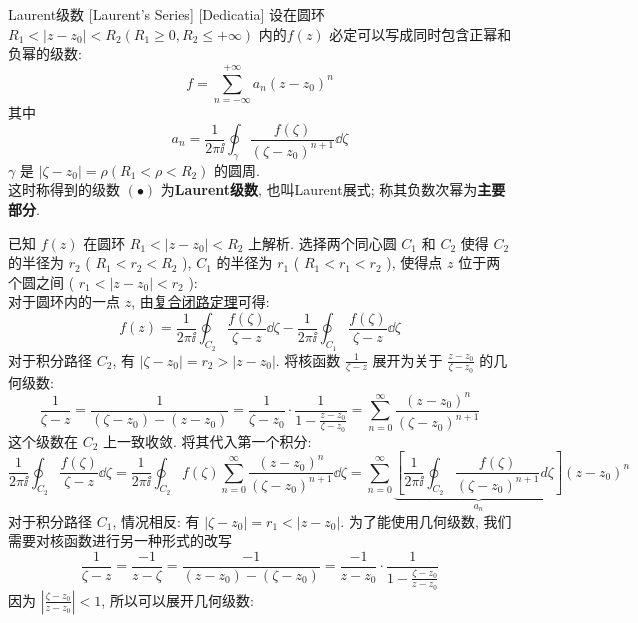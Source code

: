 \documentclass[UTF8]{ctexart}
\begin{document}
        \begin{thm}
            [Laurent]
            {Laurent级数}
            [Laurent's Series]
            [Dedicatia]
            设在圆环 \(R_1<|z-z_0|<R_2(R_1\geqslant 0, R_2\leqslant+\infty )\) 内的  \(f(z)\) 必定可以写成同时包含正幂和负幂的级数: 
            \[f=\sum_{n=-\infty}^{+\infty}a_n(z-z_0)^n\tag{ \(\bullet\) }\]
            其中
            \[a_n=\frac{1}{2\pi\ii}\oint_{\gamma}\frac{f(\zeta)}{(\zeta-z_0)^{n+1}}\dd{\zeta}\]
            \(\gamma\) 是 \(|\zeta-z_0|=\rho(R_1<\rho< R_2)\) 的圆周. \\
            这时称得到的级数 \((\bullet)\) 为\textbf{Laurent级数}, 也叫Laurent展式; 称其负数次幂为\textbf{主要部分}. 
        \end{thm}

        \begin{prf}
            已知  \(f(z)\)  在圆环  \(R_1 < |z - z_0| < R_2\)  上解析. 选择两个同心圆  \(C_1\)  和  \(C_2\)  使得  \(C_2\)  的半径为  \(r_2\)  ( \(R_1 < r_2 < R_2\) ),  \(C_1\)  的半径为  \(r_1\)  ( \(R_1 < r_1 < r_2\) ), 使得点  \(z\)  位于两个圆之间 ( \(r_1 < |z - z_0| < r_2\) ):\\
            对于圆环内的一点  \(z\), 由\hyperref[thm:CombinedClosedCircuit]{复合闭路定理}可得: 
            \[f(z) = \frac{1}{2\pi\ii} \oint_{C_2} \frac{f(\zeta)}{\zeta - z} \dd\zeta - \frac{1}{2\pi\ii} \oint_{C_1} \frac{f(\zeta)}{\zeta - z}  \dd\zeta\]
            对于积分路径  \(C_2\), 有  \(|\zeta - z_0| = r_2 > |z - z_0|\). 将核函数  \(\frac{1}{\zeta - z}\)  展开为关于  \(\frac{z-z_0}{\zeta-z_0}\)  的几何级数: 
            \[\frac{1}{\zeta - z} = \frac{1}{(\zeta - z_0) - (z - z_0)} = \frac{1}{\zeta - z_0} \cdot \frac{1}{1 - \frac{z-z_0}{\zeta-z_0}} = \sum_{n=0}^{\infty} \frac{(z - z_0)^n}{(\zeta - z_0)^{n+1}}\]
            这个级数在  \(C_2\)  上一致收敛. 将其代入第一个积分: 
            \[\frac{1}{2\pi\ii} \oint_{C_2} \frac{f(\zeta)}{\zeta - z} \dd\zeta = \frac{1}{2\pi\ii} \oint_{C_2} f(\zeta) \sum_{n=0}^{\infty} \frac{(z - z_0)^n}{(\zeta - z_0)^{n+1}} \dd\zeta = \sum_{n=0}^{\infty} \underbrace{\left[ \frac{1}{2\pi\ii} \oint_{C_2} \frac{f(\zeta)}{(\zeta - z_0)^{n+1}} d\zeta \right]}_{a_n} (z - z_0)^n\]
            对于积分路径  \(C_1\), 情况相反: 有  \(|\zeta - z_0| = r_1 < |z - z_0|\). 为了能使用几何级数, 我们需要对核函数进行另一种形式的改写
            \[\frac{1}{\zeta - z} = \frac{-1}{z - \zeta} = \frac{-1}{(z - z_0) - (\zeta - z_0)} = \frac{-1}{z - z_0} \cdot \frac{1}{1 - \frac{\zeta-z_0}{z-z_0}}\]
            因为  \(\left| \frac{\zeta-z_0}{z-z_0} \right| < 1\), 所以可以展开几何级数: 

\end{prf}
\end{document}
